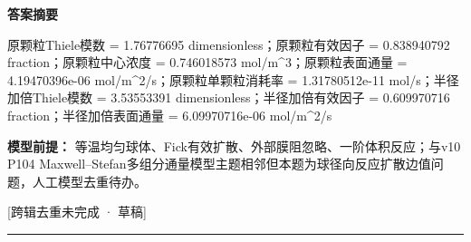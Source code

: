 \documentclass[UTF8,11pt,a4paper]{ctexart}
\begin{document}
\noindent\textbf{答案摘要}\par
原颗粒Thiele模数 = 1.76776695 dimensionless；原颗粒有效因子 = 0.838940792 fraction；原颗粒中心浓度 = 0.746018573 mol/m\textasciicircum{}3；原颗粒表面通量 = 4.19470396e-06 mol/m\textasciicircum{}2/s；原颗粒单颗粒消耗率 = 1.31780512e-11 mol/s；半径加倍Thiele模数 = 3.53553391 dimensionless；半径加倍有效因子 = 0.609970716 fraction；半径加倍表面通量 = 6.09970716e-06 mol/m\textasciicircum{}2/s\par
\noindent\textbf{模型前提：}
等温均匀球体、Fick有效扩散、外部膜阻忽略、一阶体积反应；与v10 P104 Maxwell–Stefan多组分通量模型主题相邻但本题为球径向反应扩散边值问题，人工模型去重待办。\par
\noindent\textcolor{red!65!black}{[跨辑去重未完成 · 草稿]} \par
\medskip\hrule\medskip
{}
\end{document}
